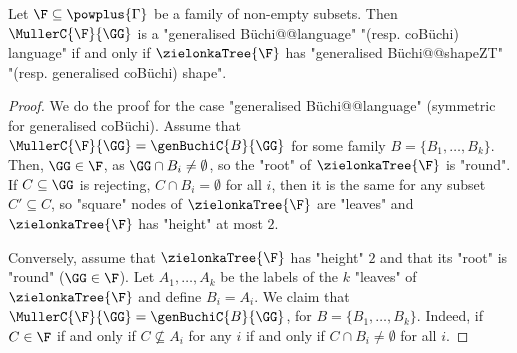 \documentclass{theoretics}
\begin{document}
\begin{proposition}\label{prop-app:genBuchi-shape-ZT}
		Let $\F\subseteq \powplus{\Gamma}$ be a family of non-empty subsets. Then $\MullerC{\F}{\GG}$ is a "generalised B\"uchi@@language" "(resp. coB\"uchi) language" if and only if $\zielonkaTree{\F}$ has "generalised B\"uchi@@shapeZT" "(resp. generalised coB\"uchi) shape".
\end{proposition}
\begin{proof}
	We do the proof for the case "generalised B\"uchi@@language" (symmetric for generalised coB\"uchi).
	Assume that $\MullerC{\F}{\GG} =\genBuchiC{B}{\GG}$  for some family $B=\{B_1,\dots,B_k\}$. Then, $\GG\in \F$, as $\GG\cap B_i \neq \emptyset$, so the "root" of $\zielonkaTree{\F}$ is "round". If $C\subseteq \GG$ is rejecting, $C\cap B_i =\emptyset$ for all $i$, then it is the same for any subset $C'\subseteq C$, so "square" nodes of $\zielonkaTree{\F}$ are "leaves" and $\zielonkaTree{\F}$ has "height" at most $2$.
	
	Conversely, assume that $\zielonkaTree{\F}$ has "height" $2$ and that its "root" is "round" ($\GG\in \F$). Let $A_1,\dots, A_k$ be the labels of the $k$ "leaves" of $\zielonkaTree{\F}$ and define $B_i = A_i$. We claim that $\MullerC{\F}{\GG} =\genBuchiC{B}{\GG}$, for $B=\{B_1,\dots,B_k\}$. Indeed, if $C\in \F$ if and only if $C\nsubseteq A_i$  for any $i$ if and only if $C\cap B_i \neq \emptyset$ for all $i$.
\end{proof}
\end{document}
